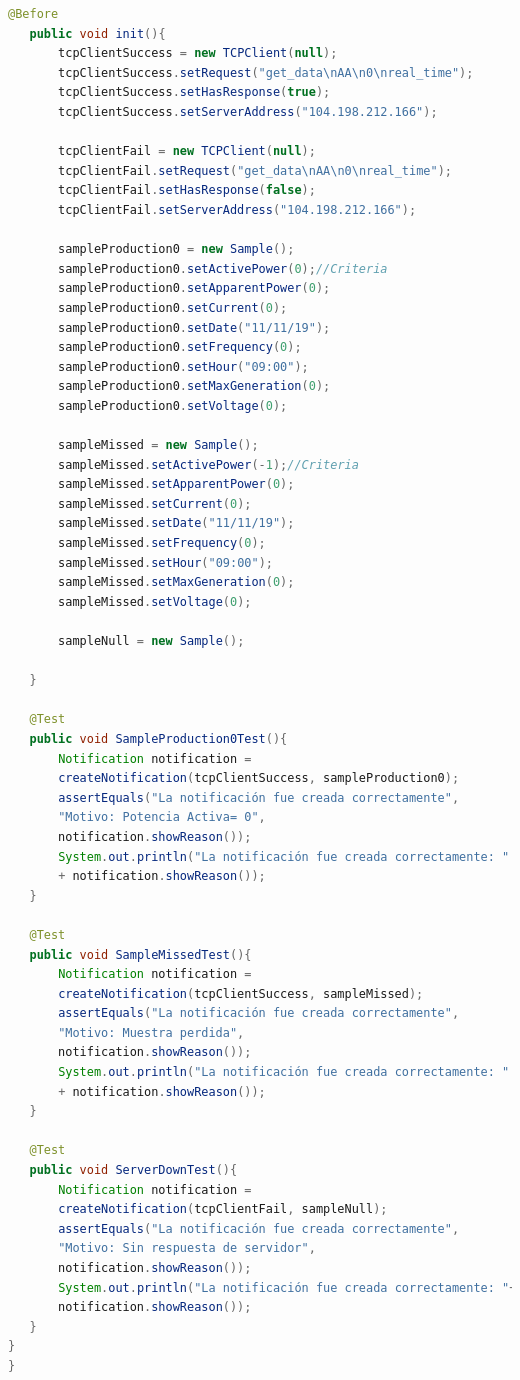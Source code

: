 \begin{lstlisting}[language= Java, frame=single]
   @Before
   public void init(){
       tcpClientSuccess = new TCPClient(null);
       tcpClientSuccess.setRequest("get_data\nAA\n0\nreal_time");
       tcpClientSuccess.setHasResponse(true);
       tcpClientSuccess.setServerAddress("104.198.212.166");

       tcpClientFail = new TCPClient(null);
       tcpClientFail.setRequest("get_data\nAA\n0\nreal_time");
       tcpClientFail.setHasResponse(false);
       tcpClientFail.setServerAddress("104.198.212.166");

       sampleProduction0 = new Sample();
       sampleProduction0.setActivePower(0);//Criteria
       sampleProduction0.setApparentPower(0);
       sampleProduction0.setCurrent(0);
       sampleProduction0.setDate("11/11/19");
       sampleProduction0.setFrequency(0);
       sampleProduction0.setHour("09:00");
       sampleProduction0.setMaxGeneration(0);
       sampleProduction0.setVoltage(0);

       sampleMissed = new Sample();
       sampleMissed.setActivePower(-1);//Criteria
       sampleMissed.setApparentPower(0);
       sampleMissed.setCurrent(0);
       sampleMissed.setDate("11/11/19");
       sampleMissed.setFrequency(0);
       sampleMissed.setHour("09:00");
       sampleMissed.setMaxGeneration(0);
       sampleMissed.setVoltage(0);

       sampleNull = new Sample();

   }

   @Test
   public void SampleProduction0Test(){
       Notification notification =
       createNotification(tcpClientSuccess, sampleProduction0);
       assertEquals("La notificación fue creada correctamente",
       "Motivo: Potencia Activa= 0",
       notification.showReason());
       System.out.println("La notificación fue creada correctamente: "
       + notification.showReason());
   }

   @Test
   public void SampleMissedTest(){
       Notification notification =  
       createNotification(tcpClientSuccess, sampleMissed);
       assertEquals("La notificación fue creada correctamente",
       "Motivo: Muestra perdida",
       notification.showReason());
       System.out.println("La notificación fue creada correctamente: "
       + notification.showReason());
   }

   @Test
   public void ServerDownTest(){
       Notification notification =  
       createNotification(tcpClientFail, sampleNull);
       assertEquals("La notificación fue creada correctamente",
       "Motivo: Sin respuesta de servidor",
       notification.showReason());
       System.out.println("La notificación fue creada correctamente: "+
       notification.showReason());
   }
}
}
\end{lstlisting}

